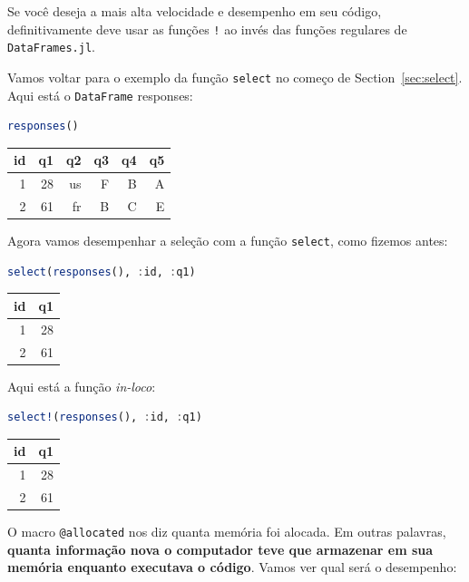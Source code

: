 \documentclass[
  notoc %
]{tufte-book}
\newcommand{\passthrough}[1]{#1}
\begin{document}
Se você deseja a mais alta velocidade e desempenho em seu código,
definitivamente deve usar as funções \passthrough{\lstinline"!"} ao
invés das funções regulares de \passthrough{\lstinline!DataFrames.jl!}.

Vamos voltar para o exemplo da função \passthrough{\lstinline!select!}
no começo de Section~\ref{sec:select}. Aqui está o
\passthrough{\lstinline!DataFrame!} responses:

\begin{lstlisting}[language=Julia]
responses()
\end{lstlisting}

\begin{longtable}[]{@{}rrrrrr@{}}
\toprule
id & q1 & q2 & q3 & q4 & q5 \\
\midrule
\endhead
1 & 28 & us & F & B & A \\
2 & 61 & fr & B & C & E \\
\bottomrule
\end{longtable}

Agora vamos desempenhar a seleção com a função
\passthrough{\lstinline!select!}, como fizemos antes:

\begin{lstlisting}[language=Julia]
select(responses(), :id, :q1)
\end{lstlisting}

\begin{longtable}[]{@{}rr@{}}
\toprule
id & q1 \\
\midrule
\endhead
1 & 28 \\
2 & 61 \\
\bottomrule
\end{longtable}

Aqui está a função \emph{in-loco}:

\begin{lstlisting}[language=Julia]
select!(responses(), :id, :q1)
\end{lstlisting}

\begin{longtable}[]{@{}rr@{}}
\toprule
id & q1 \\
\midrule
\endhead
1 & 28 \\
2 & 61 \\
\bottomrule
\end{longtable}

O macro \passthrough{\lstinline!@allocated!} nos diz quanta memória foi
alocada. Em outras palavras, \textbf{quanta informação nova o computador
teve que armazenar em sua memória enquanto executava o código}. Vamos
ver qual será o desempenho:
\end{document}
